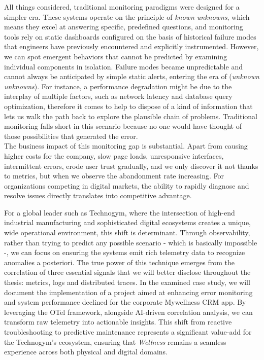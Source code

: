 \documentclass[12pt,a4paper,openright,twoside]{book}
\begin{document}
All things considered, traditional monitoring paradigms were designed for a simpler era. These systems operate on the principle of \textit{known unknowns}, which means they excel at answering specific, predefined questions, and monitoring tools rely on static dashboards configured on the basis of historical failure modes that engineers have previously encountered and explicitly instrumented. However, we can spot emergent behaviors that cannot be predicted by examining individual components in isolation. Failure modes became unpredictable and cannot always be anticipated by simple static alerts, entering the era of (\textit{unknown unknowns}). For instance, a performance degradation might be due to the interplay of multiple factors, such as network latency and database query optimization, therefore it comes to help to dispose of a kind of information that lets us walk the path back to explore the plausible chain of problems. Traditional monitoring falls short in this scenario because no one would have thought of those possibilities that generated the error. \\ The business impact of this monitoring gap is substantial. Apart from causing higher costs for the company, slow page loads, unresponsive interfaces, intermittent errors, erode user trust gradually, and we only discover it not thanks to metrics, but when we observe the abandonment rate increasing. For organizations competing in digital markets, the ability to rapidly diagnose and resolve issues directly translates into competitive advantage. 

For a global leader such as Technogym, where the intersection of high-end industrial manufacturing and sophisticated digital ecosystems creates a unique, wide operational environment, this shift is determinant. Through observability, rather than trying to predict any possible scenario - which is basically impossible -, we can focus on ensuring the systems emit rich telemetry data to recognize anomalies a posteriori. The true power of this technique emerges from the correlation of three essential signals that we will better disclose throughout the thesis: metrics, logs and distributed traces. In the examined case study, we will document the implementation of a project aimed at enhancing error monitoring and system performance declined for the corporate Mywellness CRM app. By leveraging the \ac{OTel} framework, alongside AI-driven correlation analysis, we can transform raw telemetry into actionable insights. This shift from reactive troubleshooting to predictive maintenance represents a significant value-add for the Technogym's ecosystem, ensuring that \textit{Wellness} remains a seamless experience across both physical and digital domains.  
\end{document}
